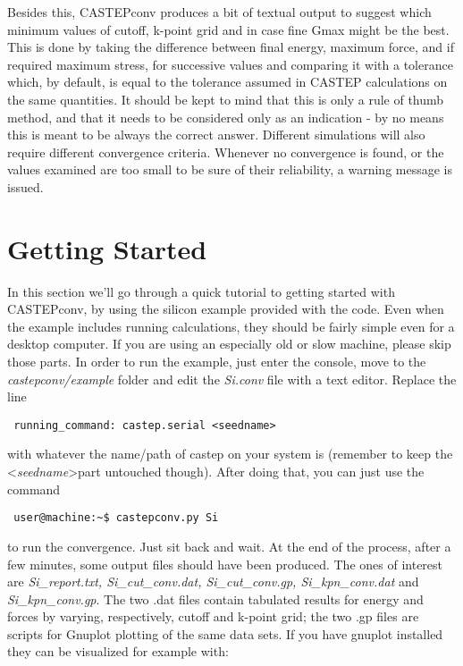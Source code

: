 \documentclass[10pt]{article}
\begin{document}
Besides this, CASTEPconv produces a bit of textual output to suggest which 
minimum values of cutoff, k-point grid and in case fine Gmax might be the best. This is done by 
taking the difference between final energy, maximum force, and if required 
maximum stress, for successive values and comparing it with a tolerance which, 
by default, is equal to the tolerance assumed in CASTEP calculations on the same 
quantities. It should be kept to mind that this is only a rule of thumb method, 
and that it needs to be considered only as an indication - by no means this is 
meant to be always the correct answer. Different simulations will also require 
different convergence criteria. Whenever no convergence is found, or the values 
examined are too small to be sure of their reliability, a warning message is 
issued.

\section{Getting Started}

In this section we'll go through a quick tutorial to getting started with CASTEPconv, by using the silicon example provided with the code. Even when the example includes running calculations, they should be fairly simple even for a desktop computer. If you are using an especially old or slow machine, please skip those parts.\newline
In order to run the example, just enter the console, move to the \textit{castepconv/example} folder and edit the \textit{Si.conv} file with a text editor. Replace the line

\begin{lstlisting}
 running_command: castep.serial <seedname>
\end{lstlisting}

with whatever the name/path of castep on your system is (remember to keep the \textless \textit{seedname}\textgreater part untouched though). After doing that, you can just use the command

\begin{lstlisting}
 user@machine:~$ castepconv.py Si
\end{lstlisting}

to run the convergence. Just sit back and wait. At the end of the process, after a few minutes, some output files should have been produced. The ones of interest are \textit {Si\_report.txt, Si\_cut\_conv.dat, Si\_cut\_conv.gp, Si\_kpn\_conv.dat} and \textit{Si\_kpn\_conv.gp}. The two .dat files contain tabulated results for energy and forces by varying, respectively, cutoff and k-point grid; the two .gp files are scripts for Gnuplot plotting of the same data sets. If you have gnuplot installed they can be visualized for example with:
\end{document}
